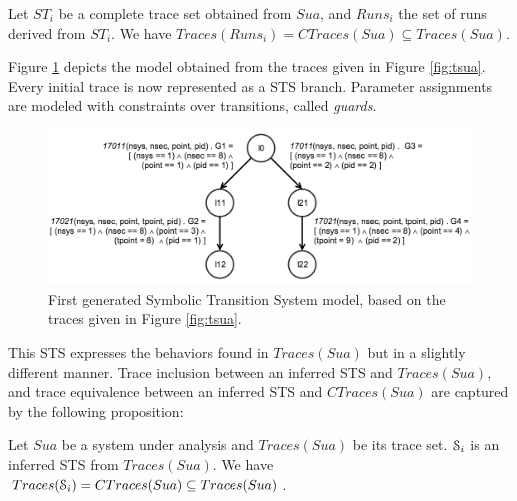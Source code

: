 \begin{proposition}
    Let $ST_i$ be a complete trace set obtained from
    $\mathit{Sua}$, and $Runs_i$ the set of runs derived from
    $ST_i$.
    We have $Traces(Runs_i) = CTraces(Sua) \subseteq Traces(Sua)$.

    \label{}
\end{proposition}

\begin{example}
Figure \ref{fig:firstmodel} depicts the model obtained from the
traces given in Figure \ref{fig:tsua}. Every initial trace is now
represented as a STS branch. Parameter assignments are modeled
with constraints over transitions, called \textit{guards}.

\begin{figure}[ht]
    \begin{center}
        \includegraphics[width=1.0\linewidth]{figures/STS1.png}
    \end{center}

  \caption{First generated Symbolic Transition System model,
  based on the traces given in Figure \ref{fig:tsua}.}
  \label{fig:firstmodel}
\end{figure}
\end{example}

This STS expresses the behaviors found in $Traces(Sua)$ but in a
slightly different manner. Trace inclusion \cite{petrenko06}
between an inferred STS and $Traces(Sua)$, and trace equivalence
\cite{petrenko06} between an inferred STS and $CTraces(Sua)$ are
captured by the following proposition:

\begin{proposition}
    Let $\mathit{Sua}$ be a system under analysis and $Traces(Sua)$ be its
    trace set. $\EuScript{S}_i$ is an inferred STS from
    $Traces(Sua)$.
    We have $Traces(\EuScript{S}_i) = CTraces(Sua) \subseteq Traces(Sua)$.

	\label{def:equivtraces_IOSTS}
\end{proposition}

